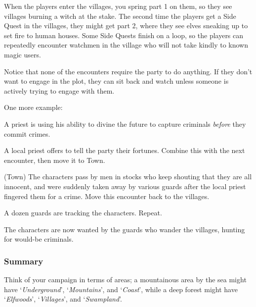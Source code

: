 \begin{multicols}{2}
\begin{list}{\Square}{}
\end{list}

When the players enter the villages, you spring part 1 on them, so they see villages burning a witch at the stake.
The second time the players get a Side Quest in the villages, they might get part 2, where they see elves sneaking up to set fire to human houses.
Some Side Quests finish on a loop, so the players can repeatedly encounter watchmen in the village who will not take kindly to known magic users.

Notice that none of the encounters require the party to do anything.
If they don't want to engage in the plot, they can sit back and watch unless someone is actively trying to engage with them.

One more example:

\begin{exampletext}

A priest is using his ability to divine the future to capture criminals \emph{before} they commit crimes.

\end{exampletext}

\begin{list}{\Square}{}

\item[\CheckedBox]{A local priest offers to tell the party their fortunes.  Combine this with the next encounter, then move it to Town.}

\item{(Town) The characters pass by men in stocks who keep shouting that they are all innocent, and were suddenly taken away by various guards after the local priest fingered them for a crime.  Move this encounter back to the villages.}

\item{A dozen guards are tracking the characters. Repeat.}

\end{list}

The characters are now wanted by the guards who wander the villages, hunting for would-be criminals.

\subsubsection{Summary}

Think of your campaign in terms of areas; a mountainous area by the sea might have `\emph{Underground}', `\emph{Mountains}', and `\emph{Coast}', while a deep forest might have `\emph{Elfwoods}', `\emph{Villages}', and `\emph{Swampland}'.


\end{multicols}
